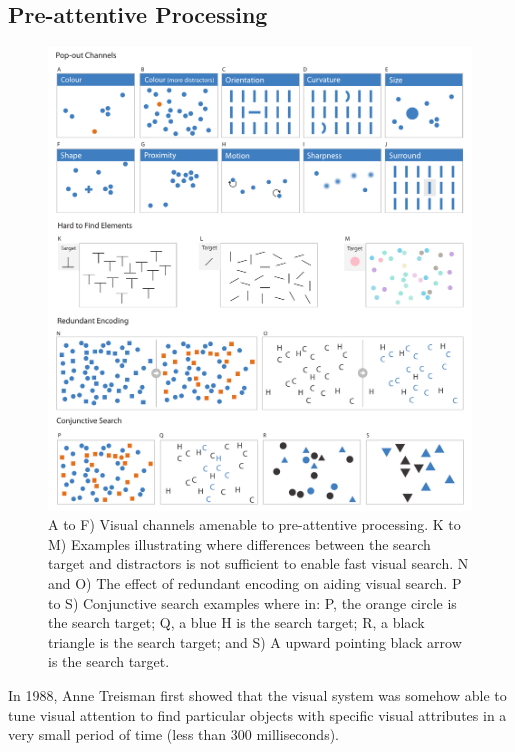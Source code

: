 \subsection{Pre-attentive Processing}
\label{sec:popout}

\begin{figure}[ht!]
\centering
\includegraphics[width=\textwidth]{images/related-work/popout.pdf}
\caption{A to F) Visual channels amenable to pre-attentive processing. 
K to M) Examples illustrating where differences between the search target and distractors is not sufficient to enable fast visual search. 
N and O) The effect of redundant encoding on aiding visual search. 
P to S) Conjunctive search examples where in: 
P, the orange circle is the search target; 
Q, a blue H is the search target;  
R, a black triangle is the search target; and 
S) A upward pointing black arrow is the search target.}
\label{fig:popout}
\end{figure}

In 1988, Anne Treisman \cite{treisman88} first showed that the visual system was somehow able to tune visual attention to find particular objects with specific visual attributes \cite{kandel2012principles, treue1996attentional} in a very small period of time (less than 300 milliseconds).

